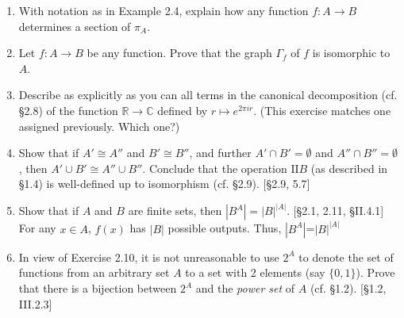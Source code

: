 \begin{enumerate}
    \item With notation as in Example 2.4, explain how any function $f: A \to B$ determines a section of $\pi_A$.

    \item Let $f: A \to B$ be any function. Prove that the graph $\Gamma_f$ of $f$ is isomorphic to $A$.

    \item Describe as explicitly as you can all terms in the canonical decomposition (cf. \S2.8) of the function $\mathbb{R} \to \mathbb{C}$ defined by $r \mapsto e^{2\pi i r}$. (This exercise matches one assigned previously. Which one?)

    \item Show that if $A' \cong A''$ and $B' \cong B''$, and further $A' \cap B' = \emptyset$ and $A'' \cap B'' = \emptyset$, then $A' \cup B' \cong A'' \cup B''$. Conclude that the operation $\text{II}B$ (as described in \S1.4) is well-defined up to isomorphism (cf. \S2.9). [\S2.9, 5.7]

    \item Show that if $A$ and $B$ are finite sets, then $|B^A| = |B|^{|A|}$. [\S2.1, 2.11, \S II.4.1]
        For any $x\in A$, $f(x)$ has $|B|$ possible outputs. Thus, $|B^A|$=$|B|^{|A|}$

    \item In view of Exercise 2.10, it is not unreasonable to use $2^A$ to denote the set of functions from an arbitrary set $A$ to a set with 2 elements (say $\{0,1\}$). Prove that there is a bijection between $2^A$ and the \textit{power set} of $A$ (cf. \S1.2). [\S1.2, III.2.3]

\end{enumerate}